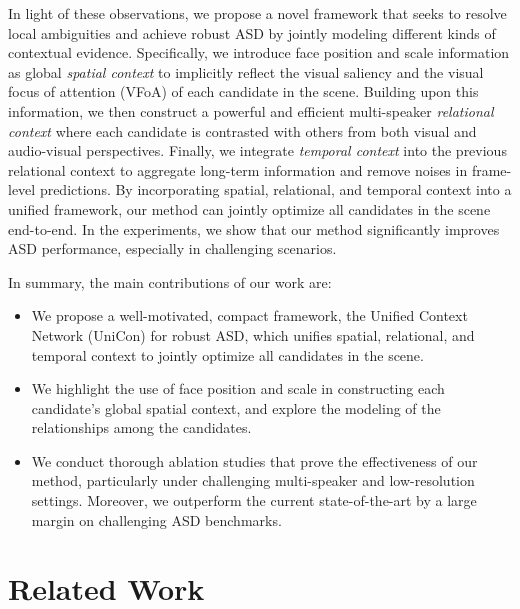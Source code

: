 \documentclass[sigconf]{acmart}
\newcommand\NetName{UniCon}
\begin{document}
\begin{CCSXML}
In light of these observations, we propose a novel framework that seeks to resolve local ambiguities and achieve robust ASD by jointly modeling different kinds of contextual evidence. 
Specifically, we introduce face position and scale information as global \textit{spatial context} to implicitly reflect the visual saliency and the visual focus of attention (VFoA) of each candidate in the scene.
Building upon this information, we then construct a powerful and efficient multi-speaker \textit{relational context} where each candidate is contrasted with others from both visual and audio-visual perspectives. 
Finally, we integrate \textit{temporal context} into the previous relational context to aggregate long-term information and remove noises in frame-level predictions. 
By incorporating spatial, relational, and temporal context into a unified framework, our method can jointly optimize all candidates in the scene end-to-end. In the experiments, we show that our method significantly improves ASD performance, especially in challenging scenarios.

In summary, the main contributions of our work are:
\begin{itemize}[topsep=2pt]
	\item We propose a well-motivated, compact framework, the Unified Context Network (\NetName{}) for robust ASD, which unifies spatial, relational, and temporal context to jointly optimize all candidates in the scene.
	\item We highlight the use of face position and scale in constructing each candidate's global spatial context, and explore the modeling of the relationships among the candidates.
	\item We conduct thorough ablation studies that prove the effectiveness of our method, particularly under challenging multi-speaker and low-resolution settings. Moreover, we outperform the current state-of-the-art by a large margin on challenging ASD benchmarks.
\end{itemize}
\vspace{-2ex} 
\section{Related Work}

\end{CCSXML}
\end{document}
